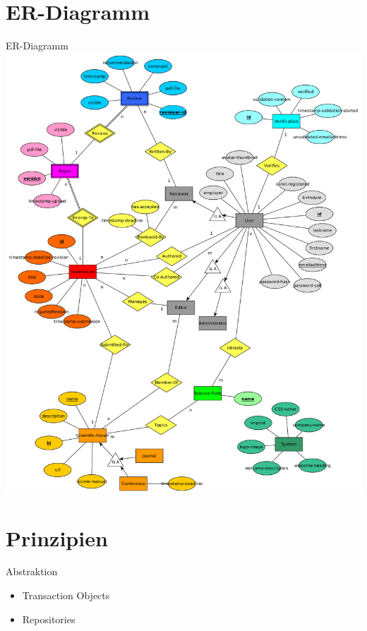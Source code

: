 \documentclass{beamer}
\begin{document}
    \section{ER-Diagramm}
    \begin{frame}{ER-Diagramm}
        \centering
        \includegraphics[height=0.9\textheight]{../../docs/Entwurf/graphics/ER-Modell.png}
    \end{frame}


    \section{Prinzipien}

    \begin{frame}{Abstraktion}
        \begin{itemize}
            \item Transaction Objects
            \item Repositories
        \end{itemize}
    \end{frame}
\end{document}

